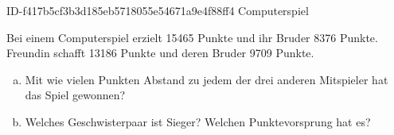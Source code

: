 \begin{exercise}
      {ID-f417b5cf3b3d185eb5718055e54671a9e4f88ff4}
      {Computerspiel}
  \ifproblem\problem\par
    Bei einem Computerspiel erzielt \xxa{} \num{15465} Punkte und ihr Bruder \xyb{}
    \num{8376} Punkte.  Freundin \xxc{} schafft \num{13186} Punkte und deren Bruder
    \xyd{} \num{9709} Punkte.
    \begin{enumerate}[a)]
      \item Mit wie vielen Punkten Abstand zu jedem der drei anderen Mitspieler
            hat \xxa{} das Spiel gewonnen?
      \item Welches Geschwisterpaar ist Sieger? Welchen Punktevorsprung hat es?
    \end{enumerate}
  \fi
\end{exercise}
